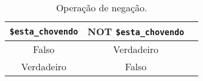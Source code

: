\begin{table}[H]
\caption{Operação de negação.}\label{tab:cap4-operacao-de-negacao}
\begin{center}
\begin{tabular}{|c|c|c|}
\hline
  \multicolumn{1}{|c|}{ \textbf{\texttt{\$esta\_chovendo}}}
&  \multicolumn{1}{|c|}{ \textbf{NOT \texttt{\$esta\_chovendo}}} \\
\hline
\hline
Falso       & Verdadeiro \\ \hline
Verdadeiro  & Falso \\ \hline
\end{tabular}
\end{center}
\end{table}
